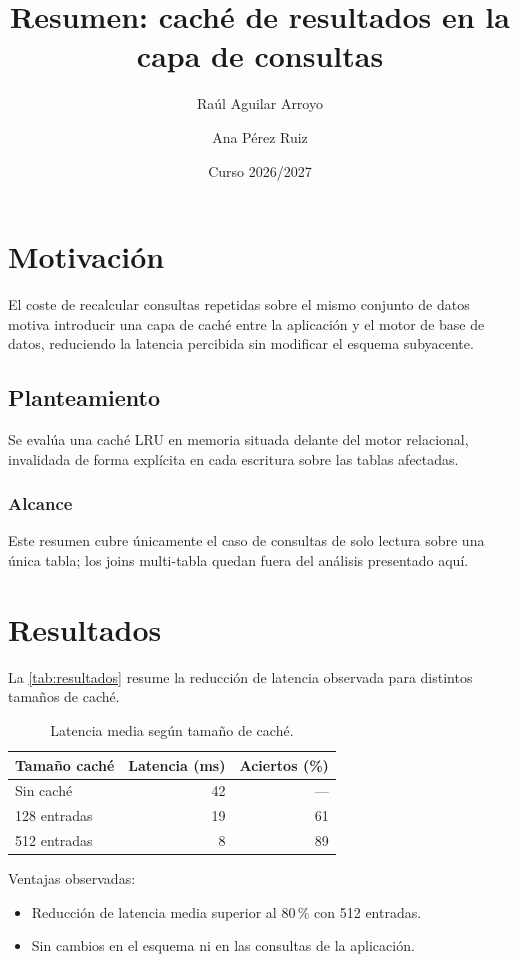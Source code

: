 \documentclass[10pt]{article}
\title{Resumen: caché de resultados en la capa de consultas}
\author{Raúl Aguilar Arroyo \and Ana Pérez Ruiz}
\date{Curso 2026/2027}
\begin{document}
\maketitle

\section{Motivación}

El coste de recalcular consultas repetidas sobre el mismo conjunto de datos
motiva introducir una capa de caché entre la aplicación y el motor de base
de datos, reduciendo la latencia percibida sin modificar el esquema
subyacente.

\subsection{Planteamiento}

Se evalúa una caché LRU en memoria situada delante del motor relacional,
invalidada de forma explícita en cada escritura sobre las tablas afectadas.

\subsubsection{Alcance} Este resumen cubre únicamente el caso de consultas
de solo lectura sobre una única tabla; los joins multi-tabla quedan fuera
del análisis presentado aquí.

\section{Resultados}

La \autoref{tab:resultados} resume la reducción de latencia observada para
distintos tamaños de caché.

\begin{table}[h]
  \centering
  \caption{Latencia media según tamaño de caché.}
  \label{tab:resultados}
  \begin{tabular}{@{}lrr@{}}
    \toprule
    Tamaño caché & Latencia (ms) & Aciertos (\%) \\
    \midrule
    Sin caché & 42 & --- \\
    128 entradas & 19 & 61 \\
    512 entradas & 8 & 89 \\
    \bottomrule
  \end{tabular}
\end{table}

Ventajas observadas:
\begin{itemize}
  \item Reducción de latencia media superior al 80\,\% con 512 entradas.
  \item Sin cambios en el esquema ni en las consultas de la aplicación.
\end{itemize}
\end{document}
